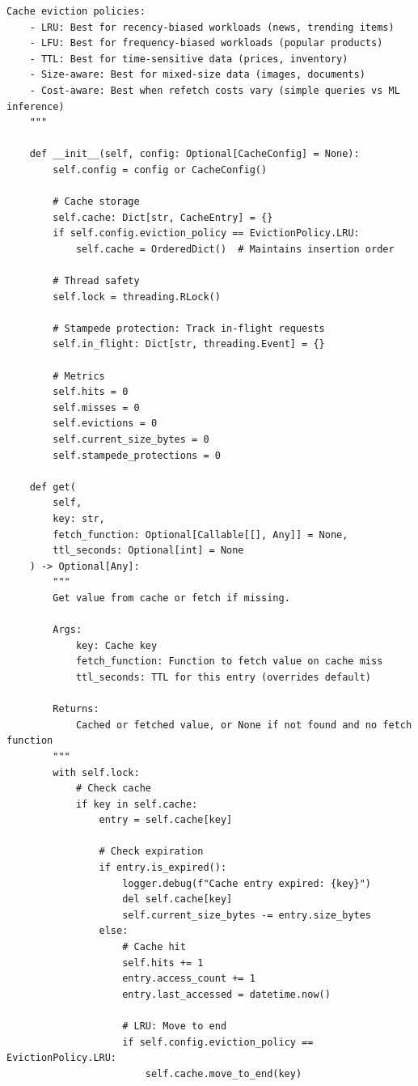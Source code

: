\begin{lstlisting}[style=python, caption={Cache Manager with Intelligent Eviction}]
    Cache eviction policies:
    - LRU: Best for recency-biased workloads (news, trending items)
    - LFU: Best for frequency-biased workloads (popular products)
    - TTL: Best for time-sensitive data (prices, inventory)
    - Size-aware: Best for mixed-size data (images, documents)
    - Cost-aware: Best when refetch costs vary (simple queries vs ML inference)
    """

    def __init__(self, config: Optional[CacheConfig] = None):
        self.config = config or CacheConfig()

        # Cache storage
        self.cache: Dict[str, CacheEntry] = {}
        if self.config.eviction_policy == EvictionPolicy.LRU:
            self.cache = OrderedDict()  # Maintains insertion order

        # Thread safety
        self.lock = threading.RLock()

        # Stampede protection: Track in-flight requests
        self.in_flight: Dict[str, threading.Event] = {}

        # Metrics
        self.hits = 0
        self.misses = 0
        self.evictions = 0
        self.current_size_bytes = 0
        self.stampede_protections = 0

    def get(
        self,
        key: str,
        fetch_function: Optional[Callable[[], Any]] = None,
        ttl_seconds: Optional[int] = None
    ) -> Optional[Any]:
        """
        Get value from cache or fetch if missing.

        Args:
            key: Cache key
            fetch_function: Function to fetch value on cache miss
            ttl_seconds: TTL for this entry (overrides default)

        Returns:
            Cached or fetched value, or None if not found and no fetch function
        """
        with self.lock:
            # Check cache
            if key in self.cache:
                entry = self.cache[key]

                # Check expiration
                if entry.is_expired():
                    logger.debug(f"Cache entry expired: {key}")
                    del self.cache[key]
                    self.current_size_bytes -= entry.size_bytes
                else:
                    # Cache hit
                    self.hits += 1
                    entry.access_count += 1
                    entry.last_accessed = datetime.now()

                    # LRU: Move to end
                    if self.config.eviction_policy == EvictionPolicy.LRU:
                        self.cache.move_to_end(key)


\end{lstlisting}
